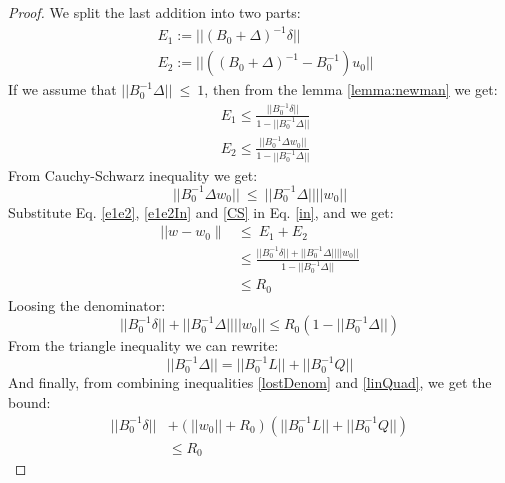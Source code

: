 \documentclass[11pt,twocolumn,varwidth=true,a4paper,fleqn]{article}
\begin{document}
\begin{proof}
We split the last addition into two parts:
\begin{equation}  \label{e1e2}
\begin{split}
& E_1:= ||(B_0+\Delta)^{-1}\delta|| \\
& E_2:= ||((B_0+\Delta)^{-1} - B_0^{-1})u_0||
\end{split}
\end{equation}
If we assume that $||B_0^{-1}\Delta||\ \leq \ 1$, 
then from the lemma \ref{lemma:newman} we get:
\begin{equation} \label{e1e2In}
\begin{split}
& E_1 \leq \frac{||B_0^{-1}\delta||}{1-||B_0^{-1}\Delta||} \\
& E_2 \leq  \frac{|| B_0^{-1}\Delta w_0||}{1-||B_0^{-1}\Delta||}
\end{split}
\end{equation}
From Cauchy-Schwarz inequality we get:
\begin{equation} \label{CS}
||B_0^{-1}\Delta w_0|| \ \leq \ ||B_0^{-1}\Delta||||w_0||
\end{equation}
Substitute Eq. \ref{e1e2}, \ref{e1e2In} and \ref{CS} in Eq. \ref{in}, and we
get:
\begin{equation}
\begin{split}
|| w-w_0 \parallel & \leq \ E_1+E_2 \\
& \leq \frac{||B_0^{-1}\delta|| + ||B_0^{-1}\Delta||||w_0||}{1 -||B_0^{-1}\Delta||} \\
& \leq R_0
\end{split}
\end{equation}
Loosing the denominator:
\begin{equation} \label{lostDenom}
||B_0^{-1}\delta|| + ||B_0^{-1}\Delta||||w_0||
\leq R_0(1 -||B_0^{-1}\Delta||)
\end{equation}
From the triangle inequality we can rewrite:
\begin{equation} \label{linQuad}
||B_0^{-1}\Delta|| = ||B_0^{-1}L||+||B_0^{-1}Q||
\end{equation}
And finally, from combining inequalities \ref{lostDenom} and \ref{linQuad},
we get the bound:
\begin{equation} \label{convexBound}
\begin{split}
||B_0^{-1}\delta|| &+ (||w_0||+R_0)(||B_0^{-1}L||+||B_0^{-1}Q||) \\ & \leq  R_0
\end{split}
\end{equation}
\end{proof}
\end{document}
